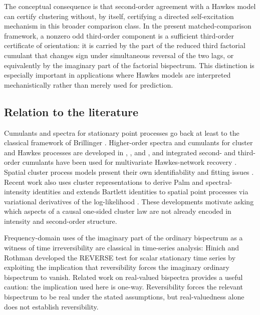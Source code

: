 \documentclass[aap,press]{apt} \volno{00} \partno{00}
\newcommand{\1}{\mathbf{1}}
\numberwithin{equation}{section}
\begin{document}
The conceptual consequence is that second-order agreement with a
Hawkes model can certify clustering without, by itself, certifying a
directed self-excitation mechanism in this broader comparison class. In the present matched-comparison framework, a nonzero odd third-order component is a sufficient third-order certificate of orientation: it is carried by the part of the reduced third factorial cumulant that changes sign under simultaneous reversal of the two lags, or equivalently by the imaginary part of the factorial bispectrum. This distinction is especially important in applications where Hawkes models are interpreted mechanistically rather than merely used for prediction.

\subsection{Relation to the literature}

Cumulants and spectra for stationary point processes go back at least to the classical framework of Brillinger \cite{Brillinger1975}. Higher-order spectra and cumulants for cluster and Hawkes processes are developed in \cite{TakahashiEtAl1998}, \cite{JovanovicHertzRotter2015}, and \cite{Privault2021}, and integrated second- and third-order cumulants have been used for multivariate Hawkes-network recovery \cite{AchabEtAl2018}. Spatial cluster process models present their own identifiability and fitting issues \cite{BaddeleyEtAl2022}. Recent work also uses cluster representations to derive Palm and spectral-intensity identities \cite{kirchner2026palm} and extends Bartlett identities to spatial point processes via variational derivatives of the log-likelihood \cite{clark2026bartlett}. These developments motivate asking which aspects of a causal one-sided cluster law are not already encoded in intensity and second-order structure.

Frequency-domain uses of the imaginary part of the ordinary bispectrum
as a witness of time irreversibility are classical in time-series
analysis: Hinich and Rothman \cite{HinichRothman1998} developed the
REVERSE test for scalar stationary time series by exploiting the
implication that reversibility forces the imaginary ordinary bispectrum
to vanish. Related work on real-valued bispectra \cite{IgloiTerdik2014} provides
a useful caution: the implication used here is one-way. Reversibility
forces the relevant bispectrum to be real under the stated assumptions,
but real-valuedness alone does not establish reversibility.
\end{document}
